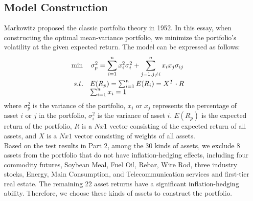 \documentclass[12pt]{article}
\begin{document}
\subsection{Model Construction}
Markowitz proposed the classic portfolio theory in 1952. In this essay, when constructing the optimal mean-variance portfolio, we minimize the portfolio’s volatility at the given expected return. The model can be expressed as follows:
\begin{align*}
&\min \quad \sigma_{p}^{2}=\sum_{i=1}^{n} x_{i}^{2}\sigma_{i}^{2} + \sum_{j=1,j\neq i}^{n} x_{i}x_{j}\sigma_{ij} \\
& \begin{array}{r@{\quad}l@{}l@{\quad}l}
s.t.& E(R_{p})=\sum_{i=1}^{n}E(R_{i})=X^{T}\cdot R\\
&\sum_{i=1}^{n} x_{i}=1
\end{array}
\end{align*}
where $\sigma_{p}^{2}$ is the variance of the portfolio, $x_{i}$ or $x_{j}$ represents the percentage of asset $i$ or $j$ in the portfolio, $\sigma_{i}^{2}$ is the variance of asset $i$. $E(R_{p})$ is the expected return of the portfolio, $R$ is a $N x 1$ vector consisting of the expected return of all assets, and $X$ is a $N x 1$ vector consisting of weights of all assets.\\
Based on the test results in Part 2, among the 30 kinds of assets, we exclude 8 assets from the portfolio that do not have inflation-hedging effects, including four commodity futures, Soybean Meal, Fuel Oil, Rebar, Wire Rod, three industry stocks, Energy, Main Consumption, and Telecommunication services and first-tier real estate. The remaining 22 asset returns have a significant inflation-hedging ability. Therefore, we choose these kinds of assets to construct the portfolio.\\
\end{document}
